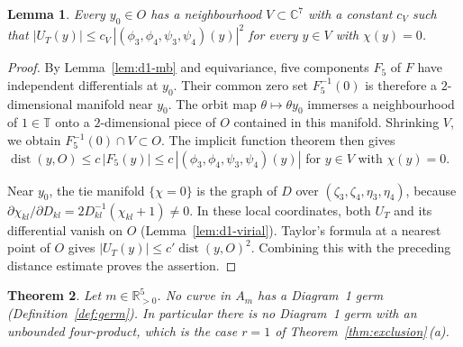 \documentclass[11pt]{amsart}
\newtheorem{theorem}{Theorem}[section]
\newtheorem{lemma}[theorem]{Lemma}
\theoremstyle{definition}
\theoremstyle{remark}
\newcommand{\C}{\mathbb{C}}
\newcommand{\Rp}{\mathbb{R}_{>0}}
\begin{document}
\begin{lemma}\label{lem:d1-estimate}
Every $y_0\in O$ has a neighbourhood $V\subset\C^7$ with a constant $c_V$ such that
$|U_T(y)|\le c_V\,|(\phi_3,\phi_4,\psi_3,\psi_4)(y)|^2$ for every $y\in V$ with $\chi(y)=0$.
\end{lemma}

\begin{proof}
{By Lemma~\ref{lem:d1-mb} and equivariance, five components $F_5$ of $F$
have independent differentials at $y_0$.  Their common zero set $F_5^{-1}(0)$ is therefore
a $2$-dimensional manifold near $y_0$.  The orbit map $\theta\mapsto\theta y_0$ immerses
a neighbourhood of $1\in\mathbb T$ onto a $2$-dimensional piece of $O$ contained in this
manifold.  Shrinking $V$, we obtain $F_5^{-1}(0)\cap V\subset O$.
The implicit function theorem then gives
$\operatorname{dist}(y,O)\le c\,|F_5(y)|\le c\,|(\phi_3,\phi_4,\psi_3,\psi_4)(y)|$
for $y\in V$ with $\chi(y)=0$.

Near $y_0$, the tie manifold $\{\chi=0\}$ is the graph of $D$ over
$(\zeta_3,\zeta_4,\eta_3,\eta_4)$, because
$\partial\chi_{kl}/\partial D_{kl}=2D_{kl}^{-1}(\chi_{kl}+1)\ne0$.
In these local coordinates, both $U_T$ and its differential vanish on $O$
(Lemma~\ref{lem:d1-virial}).  Taylor's formula at a nearest point of $O$ gives
$|U_T(y)|\le c'\operatorname{dist}(y,O)^2$.  Combining this with the preceding distance
estimate proves the assertion.}
\end{proof}

\begin{theorem}\label{thm:d1}
Let $m\in\Rp^5$.  No curve in $A_m$ has a Diagram~1 germ (Definition~\ref{def:germ}).  In
particular there is no Diagram~1 germ with an unbounded four-product, which is the case $r=1$ of
Theorem~\ref{thm:exclusion}\,(a).
\end{theorem}
\end{document}
